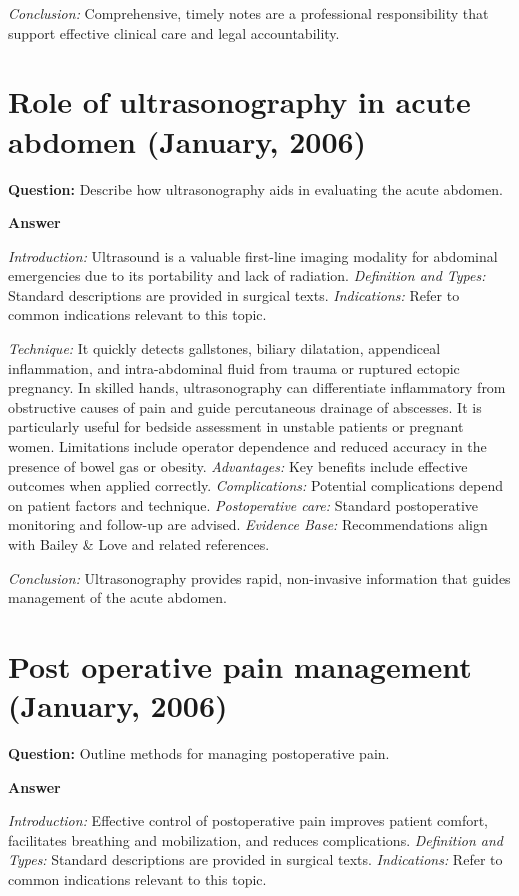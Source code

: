 \documentclass{article}
\begin{document}
\emph{Conclusion:} Comprehensive, timely notes are a professional responsibility that support effective clinical care and legal accountability.


\section{Role of ultrasonography in acute abdomen (January, 2006)}

\textbf{Question:} Describe how ultrasonography aids in evaluating the acute abdomen.

\textbf{Answer}

\emph{Introduction:} Ultrasound is a valuable first-line imaging modality for abdominal emergencies due to its portability and lack of radiation.
\emph{Definition and Types:} Standard descriptions are provided in surgical texts.
\emph{Indications:} Refer to common indications relevant to this topic.

\emph{Technique:} It quickly detects gallstones, biliary dilatation, appendiceal inflammation, and intra-abdominal fluid from trauma or ruptured ectopic pregnancy. In skilled hands, ultrasonography can differentiate inflammatory from obstructive causes of pain and guide percutaneous drainage of abscesses. It is particularly useful for bedside assessment in unstable patients or pregnant women. Limitations include operator dependence and reduced accuracy in the presence of bowel gas or obesity.
\emph{Advantages:} Key benefits include effective outcomes when applied correctly.
\emph{Complications:} Potential complications depend on patient factors and technique.
\emph{Postoperative care:} Standard postoperative monitoring and follow-up are advised.
\emph{Evidence Base:} Recommendations align with Bailey \& Love and related references.

\emph{Conclusion:} Ultrasonography provides rapid, non-invasive information that guides management of the acute abdomen.


\section{Post operative pain management (January, 2006)}

\textbf{Question:} Outline methods for managing postoperative pain.

\textbf{Answer}

\emph{Introduction:} Effective control of postoperative pain improves patient comfort, facilitates breathing and mobilization, and reduces complications.
\emph{Definition and Types:} Standard descriptions are provided in surgical texts.
\emph{Indications:} Refer to common indications relevant to this topic.
\end{document}
